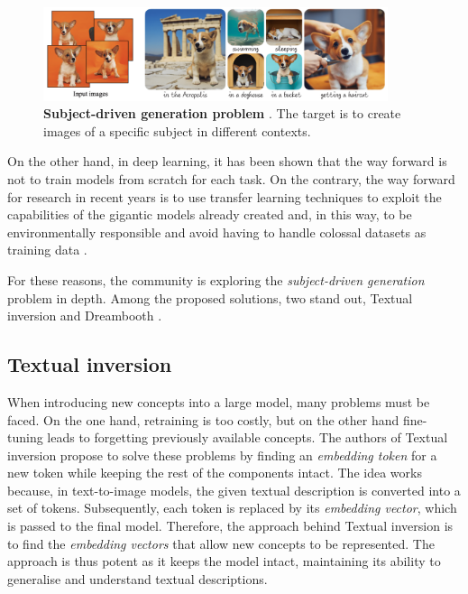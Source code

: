 \begin{figure}
    \centering
    \includegraphics[width=0.9\textwidth]{Pictures/subjectD.png} 
    \caption{\textbf{Subject-driven generation problem} \cite{ruiz2023dreambooth}. The target is to create images of a specific subject in different contexts.}
    \label{fig:subjectD}
\end{figure}

On the other hand, in deep learning, it has been shown that the way forward is not to train models from scratch for each task. On the contrary, the way forward for research in recent years is to use transfer learning techniques to exploit the capabilities of the gigantic models already created and, in this way, to be environmentally responsible and avoid having to handle colossal datasets as training data \cite{zhuang2020comprehensive}.

For these reasons, the community is exploring the \textit{subject-driven generation} problem in depth. Among the proposed solutions, two stand out, Textual inversion \cite{gal2022image} and Dreambooth \cite{ruiz2023dreambooth}.

\subsection{Textual inversion}

When introducing new concepts into a large model, many problems must be faced. On the one hand, retraining is too costly, but on the other hand fine-tuning leads to forgetting previously available concepts. The authors of Textual inversion propose to solve these problems by finding an \textit{embedding token} for a new token while keeping the rest of the components intact. The idea works because, in text-to-image models, the given textual description is converted into a set of tokens. Subsequently, each token is replaced by its \textit{embedding vector}, which is passed to the final model. Therefore, the approach behind Textual inversion is to find the \textit{embedding vectors} that allow new concepts to be represented. The approach is thus potent as it keeps the model intact, maintaining its ability to generalise and understand textual descriptions. 

